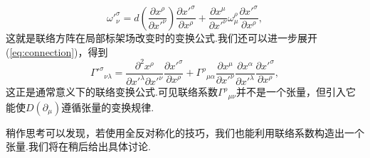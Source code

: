 		\begin{equation}\label{eq:connection}
		{\omega'}^\sigma_\nu=d\left(\frac{\partial{x^\rho}}{\partial{x'}^\nu}\right)\frac{\partial{{x'}^\sigma}}{\partial{x^\rho}}+\frac{\partial{x^\mu}}{\partial{x'}^\nu}\omega^\rho_\mu\frac{\partial{{x'}^\sigma}}{\partial{x^\rho}},
		\end{equation}
		这就是联络方阵在局部标架场改变时的变换公式.我们还可以进一步展开(\ref{eq:connection})，得到
		\begin{equation}
		{{\varGamma'}^\sigma}_{\nu\lambda}=\frac{\partial^2{x^\rho}}{\partial{x'}^\lambda\partial{x'}^\nu}\frac{\partial{{x'}^\sigma}}{\partial{x^\rho}}+{\varGamma^\rho}_{\mu\alpha}\frac{\partial{x^\mu}}{\partial{x'}^\nu}\frac{\partial{x}^\alpha}{\partial{x'}^\lambda}\frac{\partial{{x'}^\sigma}}{\partial{x^\rho}},
		\end{equation}
		这正是通常意义下的联络变换公式.可见联络系数${\varGamma^\rho}_{\mu\nu}$并不是一个张量，但引入它能使$D(\partial_\mu)$遵循张量的变换规律.
		
		稍作思考可以发现，若使用全反对称化的技巧，我们也能利用联络系数构造出一个张量.我们将在稍后给出具体讨论.

